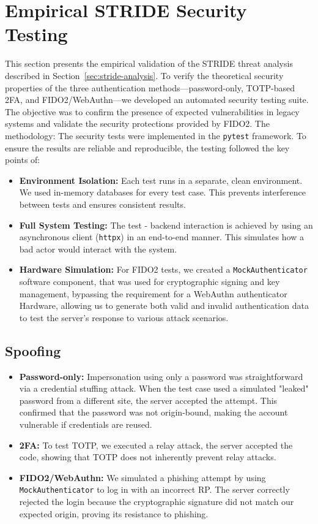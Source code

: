 \section{Empirical STRIDE Security Testing}\label{sec:stride-testing}

This section presents the empirical validation of the STRIDE threat analysis described in Section~\ref{sec:stride-analysis}. To verify the theoretical security properties of the three authentication methods—password-only, TOTP-based 2FA, and FIDO2/WebAuthn—we developed an automated security testing suite. The objective was to confirm the presence of expected vulnerabilities in legacy systems and validate the security protections provided by FIDO2. The methodology: The security tests were implemented in the \texttt{pytest} framework. To ensure the results are reliable and reproducible, the testing followed the key points of:

\begin{itemize}
    \item \textbf{Environment Isolation:} Each test runs in a separate, clean environment. We used in-memory databases for every test case. This prevents interference between tests and ensures consistent results.
    \item \textbf{Full System Testing:} The test - backend interaction is achieved by using an asynchronous client (\texttt{httpx}) in an end-to-end manner. This simulates how a bad actor would interact with the system.
    \item \textbf{Hardware Simulation:} For FIDO2 tests, we created a \texttt{MockAuthenticator} software component, that was used for cryptographic signing and key management, bypassing the requirement for a WebAuthn authenticator Hardware, allowing us to generate both valid and invalid authentication data to test the server's response to various attack scenarios.
\end{itemize}

\subsection{Spoofing}
\begin{itemize}
    \item \textbf{Password-only:} Impersonation using only a password was straightforward via a credential stuffing attack. When the test case used a simulated "leaked" password from a different site, the server accepted the attempt. This confirmed that the password was not origin-bound, making the account vulnerable if credentials are reused.
    \item \textbf{2FA:} To test TOTP, we executed a relay attack, the server accepted the code, showing that TOTP does not inherently prevent relay attacks.
    \item \textbf{FIDO2/WebAuthn:} We simulated a phishing attempt by using \texttt{MockAuthenticator} to log in with an incorrect RP. The server correctly rejected the login because the cryptographic signature did not match our expected origin, proving its resistance to phishing.
\end{itemize}

